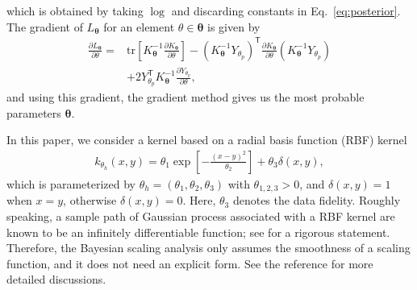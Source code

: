 which is obtained by taking $\log$ and discarding constants in Eq.~\eqref{eq:posterior}.
The gradient of $L_{\bm{\theta}}$ for an element $\theta\in\bm{\theta}$ is given by
\begin{equation}
\begin{split}
    \frac{\partial L_{\bm{\theta}}}{\partial \theta}
    =&\mathrm{tr}\left[K_{\bm{\theta}}^{-1}\frac{\partial K_{\bm{\theta}}}{\partial\theta}\right]-(K_{\bm{\theta}}^{-1}Y_{\theta_{p}})^{\mathsf{T}}\frac{\partial K_{\bm{\theta}}}{\partial \theta}(K_{\bm{\theta}}^{-1}Y_{\theta_{p}})\\
    &+2Y_{\theta_{p}}^{\mathsf{T}}K_{\bm{\theta}}^{-1}\frac{\partial Y_{\theta_{p}}}{\partial\theta},
\end{split}
\end{equation}
and using this gradient, the gradient method gives us the most probable parameters $\bm{\theta}$.

In this paper, we consider a kernel based on a radial basis function (RBF) kernel
\begin{align}
    k_{\theta_{h}}(x,y)=\theta_{1}\exp\left[-\frac{(x-y)^{2}}{\theta_{2}}\right]+\theta_{3}\delta(x,y),
\end{align}
which is parameterized by $\theta_{h}=(\theta_1,\theta_2,\theta_3)$ with $\theta_{1,2,3}>0$,
and $\delta(x,y)=1$ when $x=y$, otherwise $\delta(x,y)=0$.
Here, $\theta_{3}$ denotes the data fidelity.
Roughly speaking, a sample path of Gaussian process associated with a RBF kernel are known to be an infinitely differentiable function;
see \cite[Corollary~4.13]{kanagawa2018} for a rigorous statement.
Therefore, the Bayesian scaling analysis only assumes the smoothness of a scaling function,
and it does not need an explicit form.
See the reference \cite{harada2011,harada2015} for more detailed discussions.
